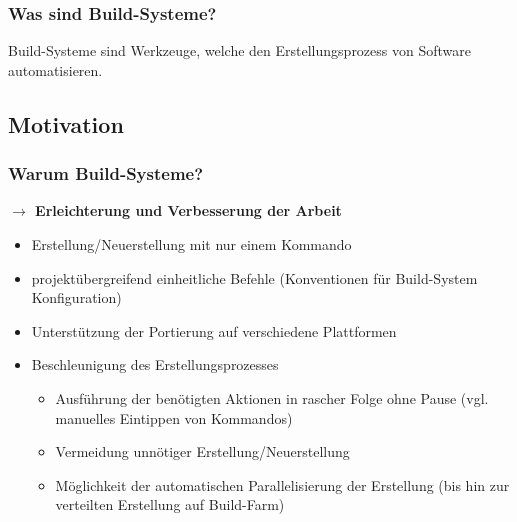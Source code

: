\begin{frame}
	\frametitle{Was sind Build-Systeme?}
	\pause
	\Large
	Build-Systeme sind Werkzeuge, welche den Erstellungsprozess von Software automatisieren.
\end{frame}

\subsection{Motivation}
\begin{frame}
	\frametitle{Warum Build-Systeme?}
	\pause
	\textbf{$\rightarrow$ Erleichterung und Verbesserung der Arbeit}
	\begin{itemize}
		\pause
		\item Erstellung/Neuerstellung mit nur einem Kommando
		\pause
		\item projektübergreifend einheitliche Befehle (Konventionen für Build-System Konfiguration)
		\pause
		\item Unterstützung der Portierung auf verschiedene Plattformen
		\pause
		\item Beschleunigung des Erstellungsprozesses
			\begin{itemize}
			\pause
			\item Ausführung der benötigten Aktionen in rascher Folge ohne Pause (vgl. manuelles Eintippen von Kommandos)
			\pause
			\item Vermeidung unnötiger Erstellung/Neuerstellung
			\pause
			\item Möglichkeit der automatischen Parallelisierung der Erstellung (bis hin zur verteilten Erstellung auf Build-Farm)
			\end{itemize}
	\end{itemize}
\end{frame}
\subsection*{}

